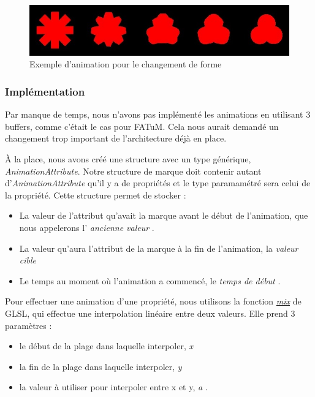 \documentclass[12pt]{article}
\begin{document}
\begin{figure}[htp]
  \centering
  \includegraphics[scale=0.8]{images/anim-exemple}
  \caption{Exemple d'animation pour le changement de forme}
  \label{fig:anim-ex}
\end{figure}

\subsubsection{Implémentation}

Par manque de temps, nous n'avons pas implémenté les animations en utilisant 3 buffers, comme c'était le
cas pour FATuM. Cela nous aurait demandé un changement trop important de l'architecture déjà en place.

À la place, nous avons créé une structure avec un type générique, \textit{AnimationAttribute}.
Notre structure de marque doit contenir autant d'\textit{AnimationAttribute} qu'il y a de propriétés et le
type paramamétré sera celui de la propriété.
Cette structure permet de stocker :
\begin{itemize}
\item La valeur de l'attribut qu'avait la marque avant le début de l'animation, que nous appelerons l'\og 
\textit{ancienne valeur} \fg.
\item La valeur qu'aura l'attribut de la marque à la fin de l'animation, la \og \textit{valeur cible} \fg
\item Le temps au moment où l'animation a commencé, le \og \textit{temps de début} \fg.
\end{itemize}

Pour effectuer une animation d'une propriété, nous utilisons la fonction 
\textit{\href{https://www.khronos.org/registry/OpenGL-Refpages/gl4/html/mix.xhtml}{mix}} de GLSL, qui effectue une
interpolation linéaire entre deux valeurs. 
Elle prend 3 paramètres : 
\begin{itemize}
\item le début de la plage dans laquelle interpoler, \og \textit{x} \fg
\item la fin de la plage dans laquelle interpoler, \og \textit{y} \fg
\item la valeur à utiliser pour interpoler entre x et y, \og \textit{a} \fg.
\end{itemize}
\end{document}
